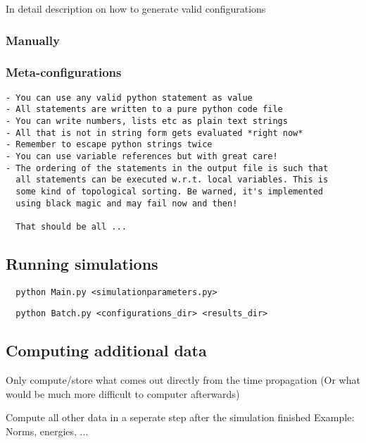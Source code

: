 \documentclass[a4paper,10pt]{report}
\begin{document}
In detail description on how to generate valid configurations

\subsubsection{Manually}

\subsubsection{Meta-configurations}

\begin{verbatim}
- You can use any valid python statement as value
- All statements are written to a pure python code file
- You can write numbers, lists etc as plain text strings
- All that is not in string form gets evaluated *right now*
- Remember to escape python strings twice
- You can use variable references but with great care!
- The ordering of the statements in the output file is such that
  all statements can be executed w.r.t. local variables. This is
  some kind of topological sorting. Be warned, it's implemented
  using black magic and may fail now and then!

  That should be all ...
\end{verbatim}

\subsection{Running simulations}

\begin{verbatim}
  python Main.py <simulationparameters.py>
\end{verbatim}

\begin{verbatim}
  python Batch.py <configurations_dir> <results_dir>
\end{verbatim}





\subsection{Computing additional data}

Only compute/store what comes out directly from the time propagation
(Or what would be much more difficult to computer afterwards)

Compute all other data in a seperate step after the simulation finished
Example: Norms, energies, ...
\end{document}
